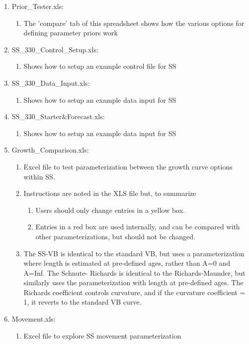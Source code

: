 \begin{enumerate}
\begin{enumerate}
		\end{enumerate}
		\item Prior\_Tester.xls:
		\begin{enumerate}
			\item The 'compare' tab of this spreadsheet shows how the various options for defining parameter priors work
		\end{enumerate}
		\item SS\_330\_Control\_Setup.xls:
		\begin{enumerate}
			\item Shows how to setup an example control file for SS
		\end{enumerate}
		\item SS\_330\_Data\_Input.xls:
		\begin{enumerate}
			\item Shows how to setup an example data input for SS
		\end{enumerate}
		\item SS\_330\_Starter\&Forecast.xls:
		\begin{enumerate}
			\item Shows how to setup an example data input for SS
		\end{enumerate}
		\item Growth\_Comparison.xls: 
		\begin{enumerate}
			\item Excel file to test parameterization between the growth curve options within SS.
			\item Instructions are noted in the XLS file but, to summarize
			\begin{enumerate}
				\item Users should only change entries in a yellow box.  
				\item Entries in a red box are used internally, and can be compared with other parameterizations, but should not be changed.
			\end{enumerate}
			\item The SS-VB is identical to the standard VB, but uses a parameterization where length is estimated at pre-defined ages, rather than A=0 and A=Inf.  The Schnute- Richards is identical to the Richards-Maunder, but similarly uses the parameterization with length at pre-defined ages.  The Richards coefficient controls curvature, and if the curvature coefficient = 1, it reverts to the standard VB curve. 
		\end{enumerate}
		\item Movement.xls:
		\begin{enumerate}
			\item Excel file to explore SS movement parameterization
		\end{enumerate}
	\end{enumerate}
		
